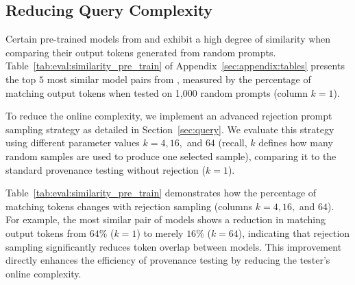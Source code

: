 \subsection{Reducing Query Complexity}
\label{sec:eval:online}

%
Certain pre-trained models from \bencho and \bencht exhibit a high degree of similarity when comparing their output tokens generated from random prompts.
Table~\ref{tab:eval:similarity_pre_train} of Appendix~\ref{sec:appendix:tables} presents the top $5$ most similar model pairs from \bencht, measured by the percentage of matching output tokens when tested on 1,000 random prompts (column $k=1$).

To reduce the online complexity, we implement an advanced rejection prompt sampling strategy as detailed in Section~\ref{sec:query}. 
%
%
We evaluate this strategy using different parameter values $k=4,16,$ and $64$ (recall, $k$ defines how many random samples are used to produce one selected sample), comparing it to the standard provenance testing without rejection ($k=1$).

Table~\ref{tab:eval:similarity_pre_train} demonstrates how the percentage of matching tokens changes with rejection sampling (columns $k=4,16,$ and $64$). For example, the most similar pair of models shows a reduction in matching output tokens from $64\%$ ($k=1$) to merely $16\%$ ($k=64$), indicating that rejection sampling significantly reduces token overlap between models. This improvement directly enhances the efficiency of provenance testing by reducing the tester's online complexity.



